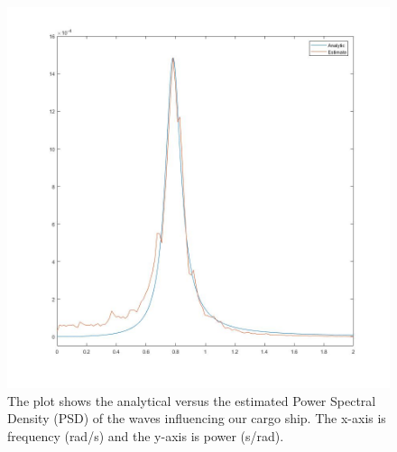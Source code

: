 \begin{figure}[H]
    \centering
    \includegraphics[width=1\textwidth]{Plots/2d_lambda_0082.jpg}
    \caption{The plot shows the analytical versus the estimated Power Spectral Density (PSD) of the waves influencing our cargo ship. The x-axis is frequency (rad/s) and the y-axis is power (s/rad).}
    \label{fig: 2d_lambda_0082}
\end{figure}